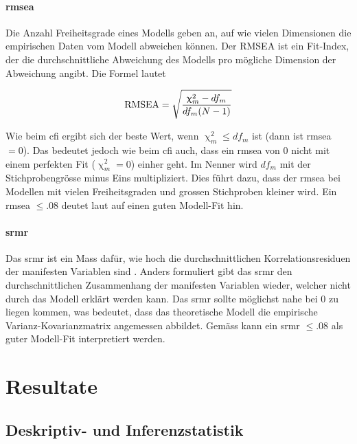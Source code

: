 \documentclass[11pt, twoside, a4paper]{book}		%
\begin{document}
\subsubsection*{\gls{rmsea}}
Die Anzahl Freiheitsgrade eines Modells geben an, auf wie vielen Dimensionen die empirischen Daten vom Modell abweichen können. Der RMSEA \citep{Steiger1990} ist ein Fit-Index, der die durchschnittliche Abweichung des Modells pro mögliche Dimension der Abweichung angibt. Die Formel lautet

$$ \textnormal{RMSEA} = \sqrt{ \frac{\upchi^2_{m}-df_{m}}{df_{m}(N-1)} } $$

\noindent Wie beim \gls{cfi} ergibt sich der beste Wert, wenn $\upchi^2_{m} \leq df_{m}$ ist (dann ist \gls{rmsea} $= 0$). Das bedeutet jedoch wie beim \gls{cfi} auch, dass ein \gls{rmsea} von $0$ nicht mit einem perfekten Fit ($\upchi^2_{m} = 0$) einher geht. Im Nenner wird $df_{m}$ mit der Stichprobengrösse minus Eins multipliziert. Dies führt dazu, dass der \gls{rmsea} bei Modellen mit vielen Freiheitsgraden und grossen Stichproben kleiner wird. Ein \gls{rmsea} $\leq.08$ deutet laut \citet{Browne1993} auf einen guten Modell-Fit hin.

\subsubsection*{\gls{srmr}}
Das \gls{srmr} ist ein Mass dafür, wie hoch die durchschnittlichen Korrelationsresiduen der manifesten Variablen sind \citep{Kline2011}. Anders formuliert gibt das \gls{srmr} den durchschnittlichen Zusammenhang der manifesten Variablen wieder, welcher nicht durch das Modell erklärt werden kann. Das \gls{srmr} sollte möglichst nahe bei $0$ zu liegen kommen, was bedeutet, dass das theoretische Modell die empirische Var\-ianz-Ko\-var\-ianz\-ma\-trix angemessen abbildet. Gemäss \citet{Hu1999} kann ein \gls{srmr} $\leq.08$ als guter Modell-Fit interpretiert werden.

\chapter{Resultate \label{cha:Resultate}}

\section{Deskriptiv- und Inferenzstatistik \label{sec:Deskriptive_Statistik}}
\end{document}

